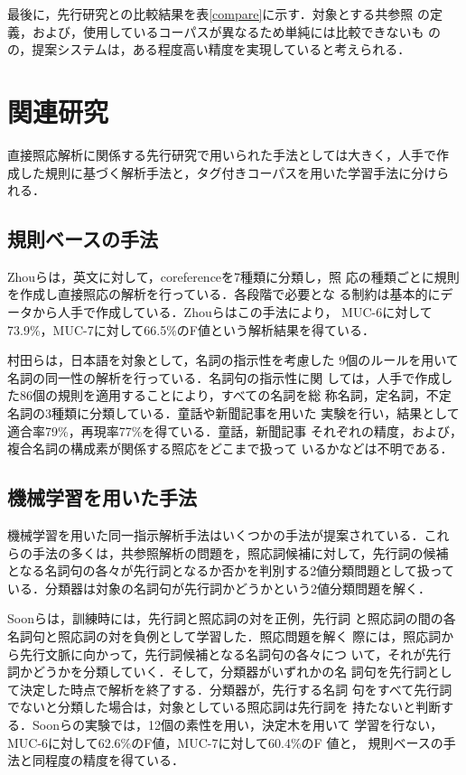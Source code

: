 \documentclass[japanese]{jnlp_1.4}
\begin{document}
  最後に，先行研究との比較結果を表\ref{compare}に示す．対象とする共参照
  の定義，および，使用しているコーパスが異なるため単純には比較できないも
  のの，提案システムは，ある程度高い精度を実現していると考えられる．


 
 \section{関連研究}

 直接照応解析に関係する先行研究で用いられた手法としては大きく，人手で作
 成した規則に基づく解析手法と，タグ付きコーパスを用いた学習手法に分けら
 れる．
  

  \subsection{規則ベースの手法}

  Zhouら\cite{Zhou2004}は，英文に対して，coreferenceを7種類に分類し，照
  応の種類ごとに規則を作成し直接照応の解析を行っている．各段階で必要とな
  る制約は基本的にデータから人手で作成している．Zhouらはこの手法により，
  MUC-6に対して73.9\%，MUC-7に対して66.5\%のF値という解析結果を得ている．
  
  村田ら\cite{Murata1996b}は，日本語を対象として，名詞の指示性を考慮した
  9個のルールを用いて名詞の同一性の解析を行っている．名詞句の指示性に関
  しては，人手で作成した86個の規則を適用することにより，すべての名詞を総
  称名詞，定名詞，不定名詞の3種類に分類している．童話や新聞記事を用いた
  実験を行い，結果として適合率79\%，再現率77\%を得ている．童話，新聞記事
  それぞれの精度，および，複合名詞の構成素が関係する照応をどこまで扱って
  いるかなどは不明である．


  \subsection{機械学習を用いた手法}

  機械学習を用いた同一指示解析手法はいくつかの手法が提案されている．これ
  らの手法の多くは，共参照解析の問題を，照応詞候補に対して，先行詞の候補
  となる名詞句の各々が先行詞となるか否かを判別する2値分類問題として扱って
  いる．分類器は対象の名詞句が先行詞かどうかという2値分類問題を解く．

  Soonら\cite{Soon2001}は，訓練時には，先行詞と照応詞の対を正例，先行詞
  と照応詞の間の各名詞句と照応詞の対を負例として学習した．照応問題を解く
  際には，照応詞から先行文脈に向かって，先行詞候補となる名詞句の各々につ
  いて，それが先行詞かどうかを分類していく．そして，分類器がいずれかの名
  詞句を先行詞として決定した時点で解析を終了する．分類器が，先行する名詞
  句をすべて先行詞でないと分類した場合は，対象としている照応詞は先行詞を
  持たないと判断する．Soonらの実験では，12個の素性を用い，決定木を用いて
  学習を行ない，MUC-6に対して62.6\%のF値，MUC-7に対して60.4\%のF 値と，
  規則ベースの手法と同程度の精度を得ている．
  
\end{document}

